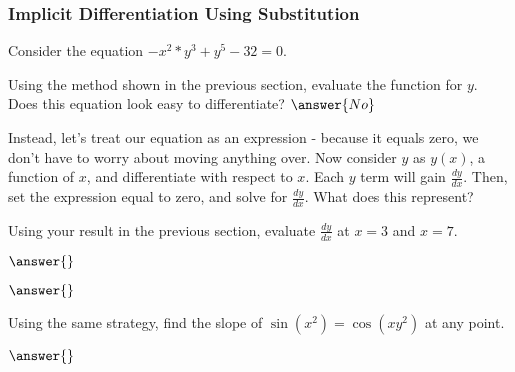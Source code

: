 \documentclass{ximera}
\begin{document}
\subsubsection{Implicit Differentiation Using Substitution}
Consider the equation $-x^2*y^3+y^5-32 = 0$.
\begin{question}
Using the method shown in the previous section, evaluate the function for $y$. Does this equation look easy to differentiate?
$\answer{No}$

Instead, let's treat our equation as an expression - because it equals zero, we don't have to worry about moving anything over. Now consider $y$ as $y(x)$, a function of $x$, and differentiate with respect to $x$. Each $y$ term will gain $\frac{dy}{dx}$. Then, set the expression equal to zero, and solve for $\frac{dy}{dx}$. What does this represent?
\begin{freeResponse}
\end{freeResponse}
\end{question}

\begin{question}
Using your result in the previous section, evaluate $\frac{dy}{dx}$ at $x = 3$ and $x = 7$.

$\answer{}$

$\answer{}$
\end{question}
\begin{question}
Using the same strategy, find the slope of  $\sin(x^2)=\cos(xy^2)$ at any point.

$\answer{}$
\end{question}
\end{document}

